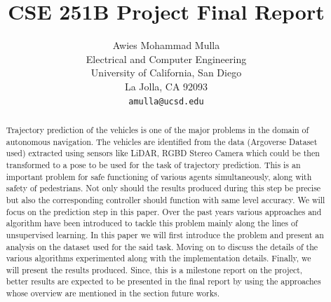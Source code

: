 \documentclass{article}
\title{CSE 251B Project Final Report}
\author{%
  Awies Mohammad Mulla\\
  Electrical and Computer Engineering\\
  University of California, San Diego\\
  La Jolla, CA 92093 \\
  \texttt{amulla@ucsd.edu} \\
}
\begin{document}
\maketitle


\begin{abstract}
  Trajectory prediction of the vehicles is one of the major problems in the domain of autonomous navigation.
  The vehicles are identified from the data (Argoverse Dataset used) extracted using sensors like LiDAR, RGBD Stereo Camera 
  which could be then transformed to a pose to be used for the task of trajectory prediction. 
  This is an important problem for safe functioning of various agents simultaneously, along with safety of pedestrians. 
  Not only should the results produced during this step be precise but also the corresponding controller should function 
  with same level accuracy. We will focus on the prediction step in this paper. Over the past years various approaches 
  and algorithm have been introduced to tackle this problem mainly along the lines of unsupervised learning. 
  In this paper we will first introduce the problem and present an analysis on the dataset used for the said task. 
  Moving on to discuss the details of the various algorithms experimented along with the implementation details. 
  Finally, we will present the results produced. Since, this is a milestone report on the project, 
  better results are expected to be presented in the final report by using the approaches whose overview are mentioned 
  in the section future works.

\end{abstract}
\end{document}
